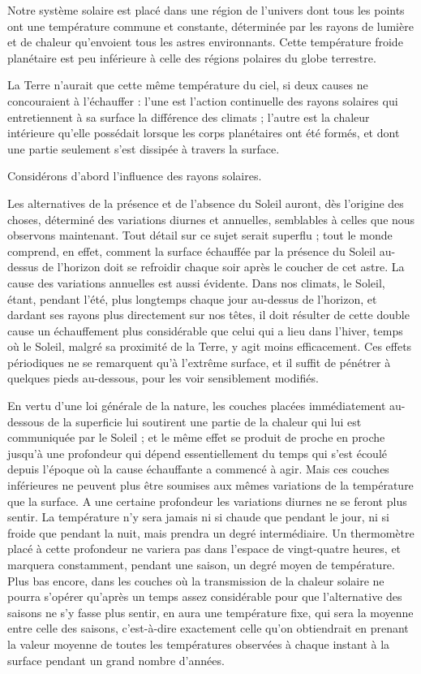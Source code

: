 \documentclass[a4paper, 11pt, oneside]{article}
\begin{document}
Notre système solaire est placé dans une région de l'univers dont tous les points ont une température commune et constante, déterminée par les rayons de lumière et de chaleur qu'envoient tous les astres environnants. Cette température froide planétaire est peu inférieure à celle des régions polaires du globe terrestre.

La Terre n'aurait que cette même température du ciel, si deux causes ne concouraient à l'échauffer : l'une est l'action continuelle des rayons solaires qui entretiennent à sa surface la différence des climats ; l'autre est la chaleur intérieure qu'elle possédait lorsque les corps planétaires ont été formés, et dont une partie seulement s'est dissipée à travers la surface.

Considérons d'abord l'influence des rayons solaires.

Les alternatives de la présence et de l'absence du Soleil auront, dès l'origine des choses, déterminé des variations diurnes et annuelles, semblables à celles que nous observons maintenant. Tout détail sur ce sujet serait superflu ; tout le monde comprend, en effet, comment la surface échauffée par la présence du Soleil au-dessus de l'horizon doit se refroidir chaque soir après le coucher de cet astre. La cause des variations annuelles est aussi évidente. Dans nos climats, le Soleil, étant, pendant l'été, plus longtemps chaque jour au-dessus de l'horizon, et dardant ses rayons plus directement sur nos têtes, il doit résulter de cette double cause un échauffement plus considérable que celui qui a lieu dans l'hiver, temps où le Soleil, malgré sa proximité de la Terre, y agit moins efficacement. Ces effets périodiques ne se remarquent qu'à l'extrême surface, et il suffit de pénétrer à quelques pieds au-dessous, pour les voir sensiblement modifiés.

En vertu d'une loi générale de la nature, les couches placées immédiatement au-dessous de la superficie lui soutirent une partie de la chaleur qui lui est communiquée par le Soleil ; et le même effet se produit de proche en proche jusqu'à une profondeur qui dépend essentiellement du temps qui s'est écoulé depuis l'époque où la cause échauffante a commencé à agir. Mais ces couches inférieures ne peuvent plus être soumises aux mêmes variations de la température que la surface. A une certaine profondeur les variations diurnes ne se feront plus sentir. La température n'y sera jamais ni si chaude que pendant le jour, ni si froide que pendant la nuit, mais prendra un degré intermédiaire. Un thermomètre placé à cette profondeur ne variera pas dans l'espace de vingt-quatre heures, et marquera constamment, pendant une saison, un degré moyen de température. Plus bas encore, dans les couches où la transmission de la chaleur solaire ne pourra s'opérer qu'après un temps assez considérable pour que l'alternative des saisons ne s'y fasse plus sentir, en aura une température fixe, qui sera la moyenne entre celle des saisons, c'est-à-dire exactement celle qu'on obtiendrait en prenant la valeur moyenne de toutes les températures observées à chaque instant à la surface pendant un grand nombre d'années.
\end{document}
